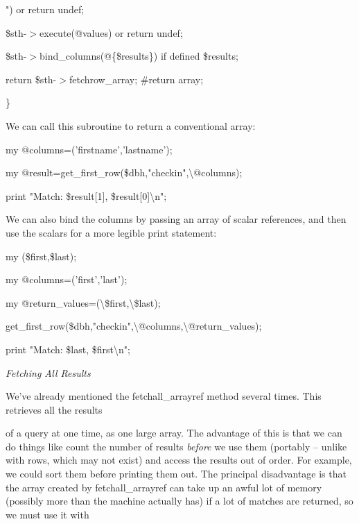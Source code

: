 \documentclass[a4paper,11pt]{book}
\begin{document}
\noindent ") or return undef;

\noindent \$sth-$>$execute(@values) or return undef;

\noindent 

\noindent \$sth-$>$bind\_columns(@\{\$results\}) if defined \$results;

\noindent 

\noindent return \$sth-$>$fetchrow\_array; \#return array;

\noindent \}

\noindent 

\noindent We can call this subroutine to return a conventional array:

\noindent 

\noindent 

\noindent my  @columns=('firstname','lastname');

\noindent my @result=get\_first\_row(\$dbh,"checkin",\textbackslash @columns);

\noindent print "Match: \$result[1], \$result[0]\textbackslash n";

\noindent 

\noindent We can also bind the columns by passing an array of scalar references, and then use the scalars for a more legible print statement:

\noindent 

\noindent my (\$first,\$last);

\noindent my @columns=('first','last');

\noindent my @return\_values=(\textbackslash \$first,\textbackslash \$last);

\noindent get\_first\_row(\$dbh,"checkin",\textbackslash @columns,\textbackslash @return\_values);

\noindent 

\noindent print "Match: \$last, \$first\textbackslash n";

\noindent 

\noindent 

\noindent \textit{Fetching All Results}

\noindent We've already mentioned the fetchall\_arrayref method several times. This retrieves all the results

\noindent of a query at one time, as one large array. The advantage of this is that we can do things like count the number of results \textit{before }we use them (portably -- unlike with rows, which may not exist) and access the results out of order. For example, we could sort them before printing them out. The principal disadvantage is that the array created by fetchall\_arrayref can take up an awful lot of memory (possibly more than the machine actually has) if a lot of matches are returned, so we must use it with
\end{document}
